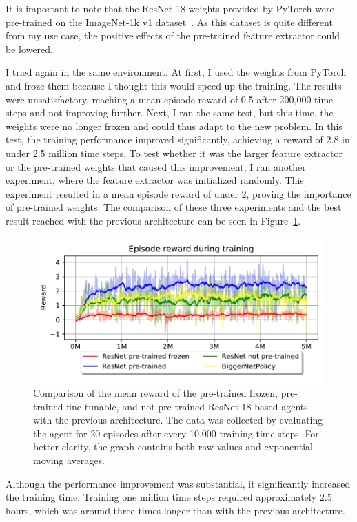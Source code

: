 \documentclass[
  digital,     %
  oneside,     %
  nosansbold,  %
  nocolorbold, %
  lof,         %
  lot,         %
]{fithesis4}
\begin{document}
It is important to note that the ResNet-18 weights provided by PyTorch were pre-trained on the ImageNet-1k v1 dataset~\cite{torchvision2016}. As this dataset is quite different from my use case, the positive effects of the pre-trained feature extractor could be lowered.

I tried again in the same environment. At first, I used the weights from PyTorch and froze them because I thought this would speed up the training. The results were unsatisfactory, reaching a mean episode reward of 0.5 after 200,000 time steps and not improving further. Next, I ran the same test, but this time, the weights were no longer frozen and could thus adapt to the new problem. In this test, the training performance improved significantly, achieving a reward of 2.8 in under 2.5 million time steps.
To test whether it was the larger feature extractor or the pre-trained weights that caused this improvement, I ran another experiment, where the feature extractor was initialized randomly. This experiment resulted in a mean episode reward of under 2, proving the importance of pre-trained weights. The comparison of these three experiments and the best result reached with the previous architecture can be seen in Figure~\ref{fig:v4_resnet_graph}. 

\begin{figure}[ht]
    \includegraphics[width=1\linewidth]{graphs/v4_resnet_graph.pdf}
    \caption{Comparison of the mean reward of the pre-trained frozen, pre-trained fine-tunable, and not pre-trained ResNet-18 based agents with the previous architecture. The data was collected by evaluating the agent for 20 episodes after every 10,000 training time steps. For better clarity, the graph contains both raw values and exponential moving averages.}
    \label{fig:v4_resnet_graph}
\end{figure}

Although the performance improvement was substantial, it significantly increased the training time. Training one million time steps required approximately 2.5 hours, which was around three times longer than with the previous architecture.
\end{document}

